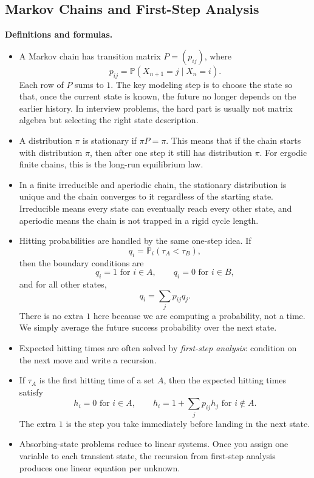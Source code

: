 \documentclass[11pt]{article}
\theoremstyle{definition}
\begin{document}
\subsection{Markov Chains and First-Step Analysis}
\textbf{Definitions and formulas.}
\begin{itemize}
    \item A Markov chain has transition matrix $P=(p_{ij})$, where
    \[
        p_{ij}=\mathbb{P}(X_{n+1}=j\mid X_n=i).
    \]
    Each row of $P$ sums to $1$. The key modeling step is to choose the state so that, once the current state is known, the future no longer depends on the earlier history. In interview problems, the hard part is usually not matrix algebra but selecting the right state description.
    \item A distribution $\pi$ is stationary if $\pi P=\pi$. This means that if the chain starts with distribution $\pi$, then after one step it still has distribution $\pi$. For ergodic finite chains, this is the long-run equilibrium law.
    \item In a finite irreducible and aperiodic chain, the stationary distribution is unique and the chain converges to it regardless of the starting state. Irreducible means every state can eventually reach every other state, and aperiodic means the chain is not trapped in a rigid cycle length.
    \item Hitting probabilities are handled by the same one-step idea. If
    \[
        q_i=\mathbb{P}_i(\tau_A<\tau_B),
    \]
    then the boundary conditions are
    \[
        q_i=1 \text{ for } i\in A,
        \qquad
        q_i=0 \text{ for } i\in B,
    \]
    and for all other states,
    \[
        q_i=\sum_j p_{ij}q_j.
    \]
    There is no extra $1$ here because we are computing a probability, not a time. We simply average the future success probability over the next state.
    \item Expected hitting times are often solved by \emph{first-step analysis}: condition on the next move and write a recursion.
    \item If $\tau_A$ is the first hitting time of a set $A$, then the expected hitting times satisfy
    \[
        h_i=0 \text{ for } i\in A,
        \qquad
        h_i = 1+\sum_j p_{ij}h_j \text{ for } i\notin A.
    \]
    The extra $1$ is the step you take immediately before landing in the next state.
    \item Absorbing-state problems reduce to linear systems. Once you assign one variable to each transient state, the recursion from first-step analysis produces one linear equation per unknown.

\end{itemize}
\end{document}
